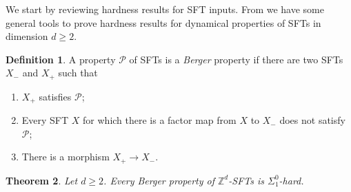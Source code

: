 \documentclass[a4paper]{article}
\newtheorem{theorem}{Theorem}[section]
\theoremstyle{definition}
\newtheorem{definition}[theorem]{Definition}
\begin{document}
We start by reviewing hardness results for SFT inputs. From \cite{carrasco-vargas_rice_2025} we have some general tools to prove hardness results for dynamical properties of SFTs in dimension $d\geq 2$.
\begin{definition}\label{def:berger}
    A property $\mathcal P$ of SFTs is a \emph{Berger} property if there are two SFTs $X_{-}$ and $X_{+}$ such that 
    \begin{enumerate}
    \item $X_+$ satisfies $\mathcal P$;
    \item Every SFT $X$ for which there is a factor map from $X$ to $X_-$ does not satisfy $\mathcal P$;
    \item There is a morphism $X_+ \to X_-$.
    \end{enumerate}
\end{definition}
\begin{theorem}\label{adyan-rabin-theorem-for-sfts}
Let $d\geq 2$. 
    Every Berger property of $\mathbb{Z}^d$-SFTs is $\Sigma_1^0$-hard. 
\end{theorem}
\end{document}
